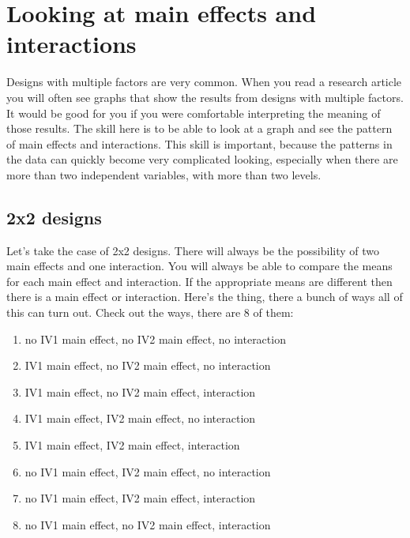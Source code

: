 \documentclass[]{book}
\providecommand{\tightlist}{%
  \setlength{\itemsep}{0pt}\setlength{\parskip}{0pt}}
\begin{document}
\hypertarget{looking-at-main-effects-and-interactions}{%
\section{Looking at main effects and interactions}\label{looking-at-main-effects-and-interactions}}

Designs with multiple factors are very common. When you read a research article you will often see graphs that show the results from designs with multiple factors. It would be good for you if you were comfortable interpreting the meaning of those results. The skill here is to be able to look at a graph and see the pattern of main effects and interactions. This skill is important, because the patterns in the data can quickly become very complicated looking, especially when there are more than two independent variables, with more than two levels.

\hypertarget{x2-designs}{%
\subsection{2x2 designs}\label{x2-designs}}

Let's take the case of 2x2 designs. There will always be the possibility of two main effects and one interaction. You will always be able to compare the means for each main effect and interaction. If the appropriate means are different then there is a main effect or interaction. Here's the thing, there a bunch of ways all of this can turn out. Check out the ways, there are 8 of them:

\begin{enumerate}
\def\labelenumi{\arabic{enumi}.}
\tightlist
\item
  no IV1 main effect, no IV2 main effect, no interaction
\item
  IV1 main effect, no IV2 main effect, no interaction
\item
  IV1 main effect, no IV2 main effect, interaction
\item
  IV1 main effect, IV2 main effect, no interaction
\item
  IV1 main effect, IV2 main effect, interaction
\item
  no IV1 main effect, IV2 main effect, no interaction
\item
  no IV1 main effect, IV2 main effect, interaction
\item
  no IV1 main effect, no IV2 main effect, interaction
\end{enumerate}
\end{document}
